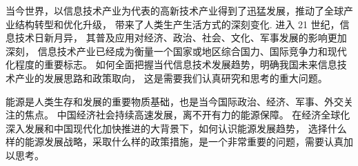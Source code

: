 当今世界，以信息技术产业为代表的高新技术产业得到了迅猛发展，推动了全球产业结构转型和优化升级，
带来了人类生产生活方式的深刻变化. 进入 21 世纪，信息技术日新月异，
其普及应用对经济、政治、社会、文化、军事发展的影响更加深刻，
信息技术产业已经成为衡量一个国家或地区综合国力、国际竞争力和现代化程度的重要标志。
如何全面把握当代信息技术发展趋势，明确我国未来信息技术产业的发展思路和政策取向，
这是需要我们认真研究和思考的重大问题。

能源是人类生存和发展的重要物质基础，也是当今国际政治、经济、军事、外交关注的焦点。
中国经济社会持续高速发展，离不开有力的能源保障。
在经济全球化深入发展和中国现代化加快推进的大背景下，如何认识能源发展趋势，
选择什么样的能源发展战略，采取什么样的政策措施，是一个非常重要的问题，需要认真加以思考。
